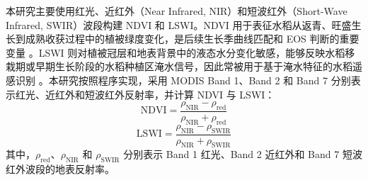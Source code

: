 本研究主要使用红光、近红外（Near Infrared, NIR）和短波红外（Short-Wave Infrared, SWIR）波段构建 NDVI 和 LSWI。NDVI 用于表征水稻从返青、旺盛生长到成熟收获过程中的植被绿度变化，是后续生长季曲线匹配和 EOS 判断的重要变量 \cite{Huete2002}。LSWI 则对植被冠层和地表背景中的液态水分变化敏感，能够反映水稻移栽期或早期生长阶段的水稻种植区淹水信号，因此常被用于基于淹水特征的水稻遥感识别 \cite{Gao1996,Xiao2005,Xiao2006,Dong2016,Boschetti2017RSE}。本研究按照程序实现，采用 MODIS Band 1、Band 2 和 Band 7 分别表示红光、近红外和短波红外反射率，并计算 NDVI 与 LSWI：
\begin{equation}
    \mathrm{NDVI} = \frac{\rho_{\mathrm{NIR}} - \rho_{\mathrm{red}}}
    {\rho_{\mathrm{NIR}} + \rho_{\mathrm{red}}}
\end{equation}
\begin{equation}
    \mathrm{LSWI} = \frac{\rho_{\mathrm{NIR}} - \rho_{\mathrm{SWIR}}}
    {\rho_{\mathrm{NIR}} + \rho_{\mathrm{SWIR}}}
\end{equation}
其中，$\rho_{\mathrm{red}}$、$\rho_{\mathrm{NIR}}$ 和 $\rho_{\mathrm{SWIR}}$ 分别表示 Band 1 红光、Band 2 近红外和 Band 7 短波红外波段的地表反射率。

